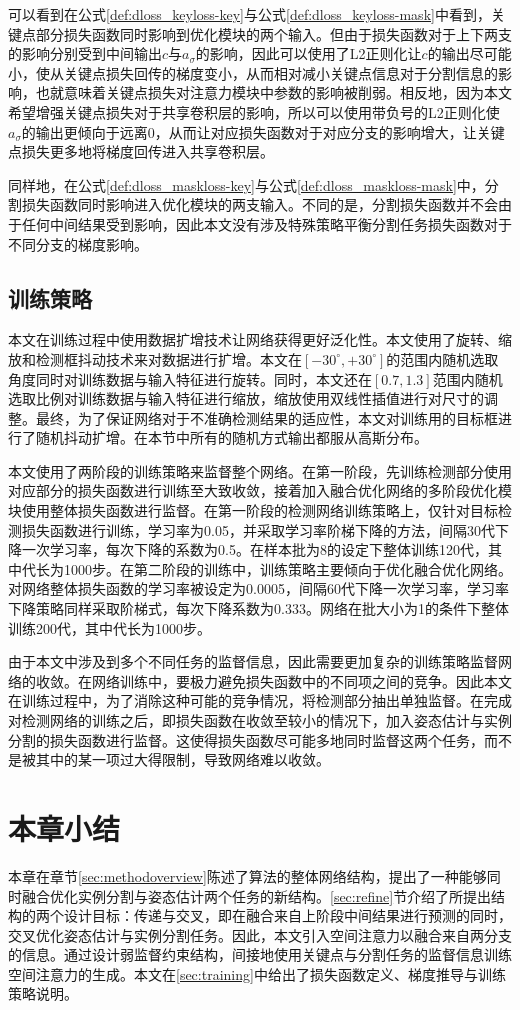 可以看到在公式\eqref{def:dloss_keyloss-key}与公式\eqref{def:dloss_keyloss-mask}中看到，关键点部分损失函数同时影响到优化模块的两个输入。但由于损失函数对于上下两支的影响分别受到中间输出$c$与$a_{\sigma}$的影响，因此可以使用了L2正则化让$c$的输出尽可能小，使从关键点损失回传的梯度变小，从而相对减小关键点信息对于分割信息的影响，也就意味着关键点损失对注意力模块中参数的影响被削弱。相反地，因为本文希望增强关键点损失对于共享卷积层的影响，所以可以使用带负号的L2正则化使$a_{\sigma}$的输出更倾向于远离0，从而让对应损失函数对于对应分支的影响增大，让关键点损失更多地将梯度回传进入共享卷积层。

同样地，在公式\eqref{def:dloss_maskloss-key}与公式\eqref{def:dloss_maskloss-mask}中，分割损失函数同时影响进入优化模块的两支输入。不同的是，分割损失函数并不会由于任何中间结果受到影响，因此本文没有涉及特殊策略平衡分割任务损失函数对于不同分支的梯度影响。


\subsection{训练策略}
\label{subsec:trainingstrategy}

本文在训练过程中使用数据扩增技术让网络获得更好泛化性。本文使用了旋转、缩放和检测框抖动技术来对数据进行扩增。本文在$[-30^\circ, +30^\circ]$的范围内随机选取角度同时对训练数据与输入特征进行旋转。同时，本文还在$[0.7, 1.3]$范围内随机选取比例对训练数据与输入特征进行缩放，缩放使用双线性插值进行对尺寸的调整。最终，为了保证网络对于不准确检测结果的适应性，本文对训练用的目标框进行了随机抖动扩增。在本节中所有的随机方式输出都服从高斯分布。

本文使用了两阶段的训练策略来监督整个网络。在第一阶段，先训练检测部分使用对应部分的损失函数进行训练至大致收敛，接着加入融合优化网络的多阶段优化模块使用整体损失函数进行监督。在第一阶段的检测网络训练策略上，仅针对目标检测损失函数进行训练，学习率为0.05，并采取学习率阶梯下降的方法，间隔30代下降一次学习率，每次下降的系数为0.5。在样本批为8的设定下整体训练120代，其中代长为1000步。在第二阶段的训练中，训练策略主要倾向于优化融合优化网络。对网络整体损失函数的学习率被设定为0.0005，间隔60代下降一次学习率，学习率下降策略同样采取阶梯式，每次下降系数为0.333。网络在批大小为1的条件下整体训练200代，其中代长为1000步。

由于本文中涉及到多个不同任务的监督信息，因此需要更加复杂的训练策略监督网络的收敛。在网络训练中，要极力避免损失函数中的不同项之间的竞争。因此本文在训练过程中，为了消除这种可能的竞争情况，将检测部分抽出单独监督。在完成对检测网络的训练之后，即损失函数在收敛至较小的情况下，加入姿态估计与实例分割的损失函数进行监督。这使得损失函数尽可能多地同时监督这两个任务，而不是被其中的某一项过大得限制，导致网络难以收敛。

\section{本章小结}
本章在章节\ref{sec:methodoverview}陈述了算法的整体网络结构，提出了一种能够同时融合优化实例分割与姿态估计两个任务的新结构。\ref{sec:refine}节介绍了所提出结构的两个设计目标：传递与交叉，即在融合来自上阶段中间结果进行预测的同时，交叉优化姿态估计与实例分割任务。因此，本文引入空间注意力以融合来自两分支的信息。通过设计弱监督约束结构，间接地使用关键点与分割任务的监督信息训练空间注意力的生成。本文在\ref{sec:training}中给出了损失函数定义、梯度推导与训练策略说明。